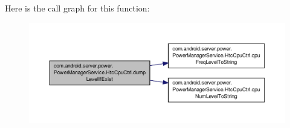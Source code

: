 Here is the call graph for this function\-:
\nopagebreak
\begin{figure}[H]
\begin{center}
\leavevmode
\includegraphics[width=350pt]{classcom_1_1android_1_1server_1_1power_1_1PowerManagerService_1_1HtcCpuCtrl_a095dd0137eb8fdb5155505205400d0c9_cgraph}
\end{center}
\end{figure}


